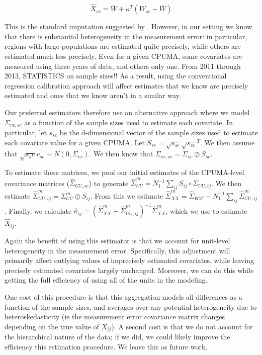 \documentclass[12pt]{article}
\begin{document}
$$
\hat{X}_{sc} = \bar{W} + \kappa^T(W_{sc} - \bar{W})
$$

This is the standard imputation suggested by \cite{carroll2006measurement}. However, in our setting we know that there is substantial heterogeneity in the measurement error: in particular, regions with large populations are estimated quite precisely, while others are estimated much less precisely. Even for a given CPUMA, some covariates are measured using three years of data, and others only one. From 2011 through 2013, STATISTICS on sample sizes!! As a result, using the conventional regression calibration approach will affect estimates that we know are precisely estimated and ones that we know aren't in a similar way. 

Our preferred estimators therefore use an alternative approach where we model $\Sigma_{vv, sc}$ as a function of the sample sizes used to estimate each covariate. In particular, let $s_{sc}$ be the d-dimensional vector of the sample sizes used to estimate each covariate value for a given CPUMA. Let $S_{sc} = \sqrt{s_{sc}}\sqrt{s_{sc}}^T$. We then assume that $\sqrt{s_sc}v_{sc} \sim N(0, \Sigma_{vv})$. We then know that $\Sigma_{vv, sc} = \Sigma_{vv} \oslash S_{sc}$. 

To estimate these matrices, we pool our initial estimates of the CPUMA-level covariance matrices ($\hat{\Sigma}_{UU, sc}$) to generate $\hat{\Sigma}_{UU}^m = N_1^{-1}\sum_{ij} S_{ij} \circ \Sigma_{UU, ij}$. We then estimate $\hat{\Sigma}_{UU, ij}^m = \Sigma_{UU}^m \oslash S_{ij}$. From this we estimate $\hat{\Sigma}^m_{XX} = \hat{\Sigma}_{WW} - N_1^{-1}\sum_{ij}\hat{\Sigma}^m_{UU, ij}$. Finally, we calculate $\hat{\kappa}_{ij} = (\hat{\Sigma}^m_{XX} + \hat{\Sigma}^m_{UU, ij})^{-1}\hat{\Sigma}^m_{XX}$, which we use to estimate $\hat{X}_{ij}$. 

Again the benefit of using this estimator is that we account for unit-level heterogeneity in the measurement error. Specifically, this adjustment will primarily affect outlying values of imprecisely estimated covariates, while leaving precisely estimated covariates largely unchanged. Moreover, we can do this while getting the full efficiency of using all of the units in the modeling. 

One cost of this procedure is that this aggregation models all differences as a function of the sample sizes, and averages over any potential heterogeneity due to heteroskedasticity (ie the measurement error covariance matrix changes depending on the true value of $X_{ij}$). A second cost is that we do not account for the hierarchical nature of the data; if we did, we could likely improve the efficiency this estimation procedure. We leave this as future work.
\end{document}
